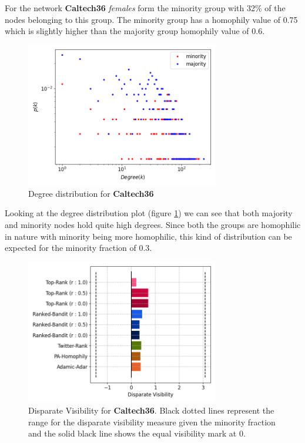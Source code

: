 For the network \textbf{Caltech36} \textit{females} form the minority group with 32\% of the nodes belonging to this group. The minority group has a homophily value of 0.75 which is slightly higher than the majority group homophily value of 0.6. 

\begin{figure}
	\centering
	\includegraphics[trim=0 10 0 10, clip, width=0.75\textwidth]{images/dd_caltech.png}
	\caption{Degree distribution for \textbf{Caltech36}}
	\label{dd_caltech}
\end{figure}

Looking at the degree distribution plot (figure \ref{dd_caltech}) we can see that both majority and minority nodes hold quite high degrees. Since both the groups are homophilic in nature with minority being more homophilic, this kind of distribution can be expected for the minority fraction of 0.3. 

\begin{figure}
	\centering
	\includegraphics[trim=0 10 0 10, clip, width=0.75\textwidth]{images/dv_caltech.png}
	\caption{Disparate Visibility for \textbf{Caltech36}. Black dotted lines represent the range for the disparate visibility measure given the minority fraction and the solid black line shows the equal visibility mark at 0.}
	\label{dv_caltech}
\end{figure}

